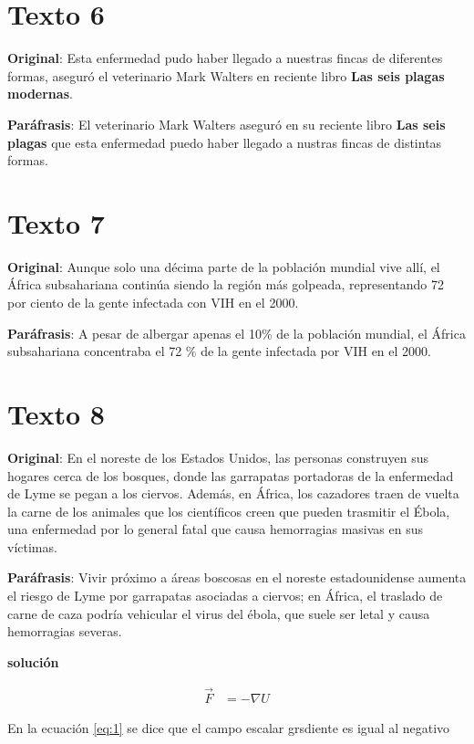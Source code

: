 \documentclass{article}
\begin{document}
\section*{Texto 6} \vspace{0.5cm}

\textcolor{trueblue}{\textbf{Original}}:  Esta enfermedad pudo haber llegado a nuestras fincas de diferentes
formas, aseguró el veterinario Mark Walters en reciente libro \textbf{Las seis plagas modernas}.

\textcolor{Apple Green}{\textbf{Paráfrasis}}: El veterinario Mark Walters aseguró en su reciente libro \textbf{Las seis plagas} que esta enfermedad puedo haber llegado a nustras fincas de distintas formas.

\section*{Texto 7} \vspace{0.5cm}

\textcolor{trueblue}{\textbf{Original}}: Aunque solo una décima parte de la población mundial vive allí, el África
subsahariana continúa siendo la región más golpeada, representando 72 por ciento
de la gente infectada con VIH en el 2000.

\textcolor{Apple Green}{\textbf{Paráfrasis}}: A pesar de albergar apenas el 10\% de la población mundial, el África subsahariana concentraba el 72 \% de la gente infectada por VIH en el 2000. 

\section*{Texto 8} \vspace{0.5cm}

\textcolor{trueblue}{\textbf{Original}}:  En el noreste de los Estados Unidos, las personas construyen sus
hogares cerca de los bosques, donde las garrapatas portadoras de la enfermedad
de Lyme se pegan a los ciervos. Además, en África, los cazadores traen de vuelta
la carne de los animales que los científicos creen que pueden trasmitir el Ébola, una
enfermedad por lo general fatal que causa hemorragias masivas en sus víctimas.

\textcolor{Apple Green}{\textbf{Paráfrasis}}: Vivir próximo a áreas boscosas en el noreste estadounidense aumenta el riesgo de Lyme por garrapatas asociadas a ciervos; en África, el traslado de carne de caza podría vehicular el virus del ébola, que suele ser letal y causa hemorragias severas.


\textcolor{Cinnabar}{\textbf{solución}} \vspace{0.5cm}


\begin{equation*}
	\begin{split}
	\vec{F}	&= -\nabla{U}
		\end{split} \label{eq:1}
	\end{equation*} \vspace{0.5cm}
	
	En la ecuación \ref{eq:1} se dice que el campo escalar grsdiente es igual al negativo
	
\end{document}
